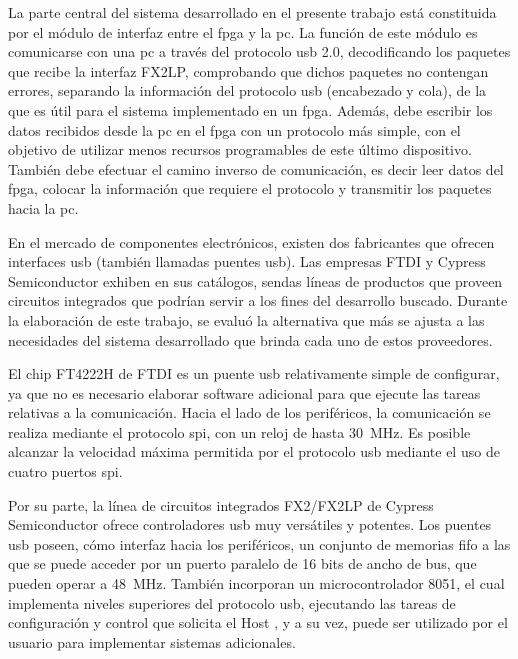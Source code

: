 La parte central del sistema desarrollado en el presente trabajo está constituida por el módulo de interfaz entre el \acrshort{fpga} y la \acrshort{pc}. La función de este módulo es comunicarse con una \acrshort{pc} a través del protocolo \acrshort{usb} 2.0, decodificando los paquetes que recibe la interfaz FX2LP, comprobando que dichos paquetes no contengan errores, separando la información del protocolo \acrshort{usb} (encabezado y cola), de la que es útil para el sistema implementado en un \acrshort{fpga}. Además, debe escribir los datos recibidos desde la \acrshort{pc} en el \acrshort{fpga} con un protocolo más simple, con el objetivo de utilizar menos recursos programables de este último dispositivo. También debe efectuar el camino inverso de comunicación, es decir leer datos del \acrshort{fpga}, colocar la información que requiere el protocolo y transmitir los paquetes hacia la \acrshort{pc}.%

En el mercado de componentes electrónicos, existen dos fabricantes que ofrecen interfaces \acrshort{usb} (también llamadas puentes \acrshort{usb}). Las empresas FTDI y Cypress Semiconductor exhiben en sus catálogos, sendas líneas de productos que proveen circuitos integrados que podrían servir a los fines del desarrollo buscado. Durante la elaboración de este trabajo, se evaluó la alternativa que más se ajusta a las necesidades del sistema desarrollado que brinda cada uno de estos proveedores.

El chip FT4222H de FTDI es un puente \acrshort{usb} relativamente simple de configurar, ya que no es necesario elaborar software adicional para que ejecute las tareas relativas a la comunicación. Hacia el lado de los periféricos, la comunicación se realiza mediante el protocolo \acrfull{spi}, con un reloj de hasta \SI{30}{\mega\hertz}. Es posible alcanzar la velocidad máxima permitida por el protocolo \acrshort{usb} mediante el uso de cuatro puertos \acrshort{spi}.%

Por su parte, la línea de circuitos integrados FX2/FX2LP de Cypress Semiconductor ofrece controladores \acrshort{usb} muy versátiles y potentes. Los puentes \acrshort{usb} poseen, cómo interfaz hacia los periféricos, un conjunto de memorias \acrshort{fifo} a las que se puede acceder por un puerto paralelo de 16 bits de ancho de bus, que pueden operar a \SI{48}{\mega\hertz}. También incorporan un microcontrolador 8051, el cual implementa niveles superiores del protocolo \acrshort{usb}, ejecutando las tareas de configuración y control que solicita el Host \cite{CypressSemiconductor2014fx2lp}, y a su vez, puede ser utilizado por el usuario para implementar sistemas adicionales.

